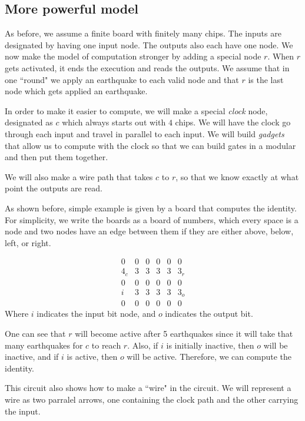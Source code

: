 \documentclass[runningheads,a4paper]{llncs}
\begin{document}
\subsection{More powerful model}

As before, we assume a finite board with finitely many chips. The inputs are designated by having one input node. The outputs also each have one node. We now make the model of computation stronger by adding a special node $r$. When $r$ gets activated, it ends the execution and reads the outputs. We assume that in one ``round" we apply an earthquake to each valid node and that $r$ is the last node which gets applied an earthquake. 

In order to make it easier to compute, we will make a special \textit{clock} node, designated as $c$ which always starts out with $4$ chips. We will have the clock go through each input and travel in parallel to each input. We will build \textit{gadgets} that allow us to compute with the clock so that we can build gates in a modular and then put them together. 

We will also make a wire path that takes $c$ to $r$, so that we know exactly at what point the outputs are read. 

As shown before, simple example is given by a board that computes the identity. For simplicity, we write the boards as a board of numbers, which every space is a node and two nodes have an edge between them if they are either above, below, left, or right.

\[ \begin{array}{cccccc} 0 & 0 & 0 & 0 & 0 & 0 \\
				     4_c & 3 & 3 & 3 & 3 & 3_r \\
				     0 & 0 & 0 & 0 & 0 & 0 \\
				     i  & 3 & 3 & 3 & 3 & 3_o \\
				     0 & 0 & 0 & 0 & 0 & 0 \end{array} \]
Where $i$ indicates the input bit node, and $o$ indicates the output bit. 

One can see that $r$ will become active after 5 earthquakes since it will take that many earthquakes for $c$ to reach $r$. Also, if $i$ is initially inactive, then $o$ will be inactive, and if $i$ is active, then $o$ will be active. Therefore, we can compute the identity. 

This circuit also shows how to make a ``wire" in the circuit. We will represent a wire as two parralel arrows, one containing the clock path and the other carrying the input. 
\end{document}
